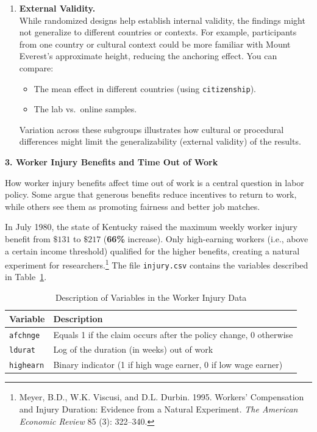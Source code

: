 \documentclass[12pt]{article}
\begin{document}
\begin{enumerate}
  \item \textbf{External Validity.}\\
  While randomized designs help establish internal validity, the findings might not generalize to different countries or contexts. For example, participants from one country or cultural context could be more familiar with Mount Everest’s approximate height, reducing the anchoring effect. You can compare:
  \begin{itemize}
    \item The mean effect in different countries (using \texttt{citizenship}).
    \item The lab vs.\ online samples.
  \end{itemize}
  Variation across these subgroups illustrates how cultural or procedural differences might limit the generalizability (external validity) of the results.
\end{enumerate}



\vspace{0.5cm}


\begin{center}
    \textbf{\large 3. Worker Injury Benefits and Time Out of Work}    
\end{center}

How worker injury benefits affect time out of work is a central question in labor policy. Some argue that generous benefits reduce incentives to return to work, while others see them as promoting fairness and better job matches. 

In July 1980, the state of Kentucky raised the maximum weekly worker injury benefit from $\$131$ to $\$217$ (\textbf{66\%} increase). Only high-earning workers (i.e., above a certain income threshold) qualified for the higher benefits, creating a natural experiment for researchers.\footnote{Meyer, B.D., W.K. Viscusi, and D.L. Durbin. 1995. Workers’ Compensation and Injury Duration: Evidence from a Natural Experiment. \emph{The American Economic Review} 85 (3): 322–340.} The file \texttt{injury.csv} contains the variables described in Table~\ref{tab:injury-data}.

\begin{table}[H]
\centering
\caption{Description of Variables in the Worker Injury Data}\label{tab:injury-data}
\begin{tabular}{ll}
\toprule
\textbf{Variable} & \textbf{Description} \\
\midrule
\texttt{afchnge} & Equals 1 if the claim occurs after the policy change, 0 otherwise \\
\texttt{ldurat}  & Log of the duration (in weeks) out of work \\
\texttt{highearn}& Binary indicator (1 if high wage earner, 0 if low wage earner) \\
\bottomrule
\end{tabular}
\end{table}
\end{document}
